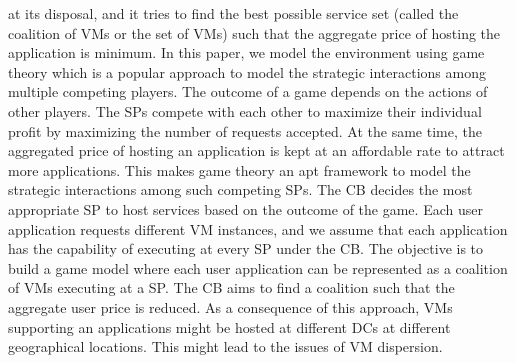 \documentclass[conference]{IEEEtran}
\newcommand\tab[1][0.8cm]{\hspace*{#1}}
\begin{document}
at its disposal, and it tries to find the best possible service set
(called the coalition of VMs or the set of VMs) such that the
aggregate price of hosting the application is minimum.
\newline
\tab In this paper, we model the environment using game theory
which is a popular approach to model the strategic interactions
among multiple competing players. The outcome of a game
depends on the actions of other players. The SPs compete with
each other to maximize their individual profit by maximizing
the number of requests accepted. At the same time, the aggregated price of hosting an application is kept at an affordable
rate to attract more applications. This makes game theory
an apt framework to model the strategic interactions among
such competing SPs. The CB decides the most appropriate
SP to host services based on the outcome of the game.
Each user application requests different VM instances, and we
assume that each application has the capability of executing
at every SP under the CB. The objective is to build a game
model where each user application can be represented as a
coalition of VMs executing at a SP. The CB aims to find a
coalition such that the aggregate user price is reduced. As a
consequence of this approach, VMs supporting an applications
might be hosted at different DCs at different geographical
locations. This might lead to the issues of VM dispersion.
\end{document}
